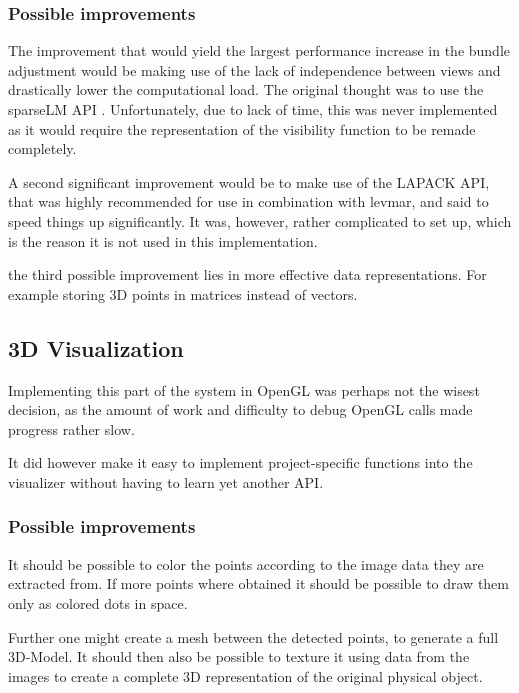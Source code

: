 \subsubsection{Possible improvements}
The improvement that would yield the largest performance increase in the bundle adjustment would be making use of the lack of independence between views and drastically lower the computational load. The original thought was to use the sparseLM API \cite{sparseLM}. Unfortunately, due to lack of time, this was never implemented as it would require the representation of the visibility function to be remade completely. 

A second significant improvement would be to make use of the LAPACK API, that was highly recommended for use in combination with levmar, and said to speed things up significantly. It was, however, rather complicated to set up, which is the reason it is not used in this implementation.

the third possible improvement lies in more effective data representations. For example storing 3D points in matrices instead of vectors.

\subsection{3D Visualization}
Implementing this part of the system in OpenGL was perhaps not the wisest decision, as the amount of work and difficulty to debug OpenGL calls made progress rather slow.

It did however make it easy to implement project-specific functions into the visualizer without having to learn yet another API.

\subsubsection{Possible improvements}
It should be possible to color the points according to the image data they are extracted from. If more points where obtained it should be possible to draw them only as colored dots in space.

Further one might create a mesh between the detected points, to generate a full 3D-Model. It should then also be possible to texture it using data from the images to create a complete 3D representation of the original physical object.